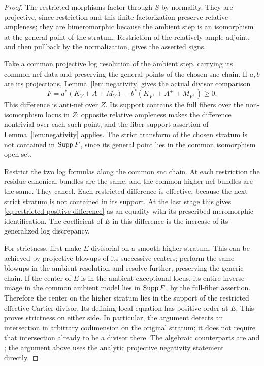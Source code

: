 \begin{proof}
The restricted morphisms factor through $S$ by normality.
They are projective, since restriction and this finite
factorization preserve relative ampleness; they are
bimeromorphic because the ambient step is an isomorphism
at the general point of the stratum.  Restriction of the
relatively ample adjoint, and then pullback by the
normalization, gives the asserted signs.

Take a common projective log resolution of the ambient step,
carrying its common nef data and preserving the general
points of the chosen snc chain.  If $a,b$ are its projections,
Lemma~\ref{lem:negativity} gives the actual divisor comparison
\[
 F=a^*(K_V+A+M_V)-b^*(K_{V^+}+A^++M_{V^+})\geq0.
\]
This difference is anti-nef over $Z$.  Its support contains
the full fibers over the non-isomorphism locus in $Z$:
opposite relative ampleness makes the difference nontrivial
over each such point, and the fiber-support assertion of
Lemma~\ref{lem:negativity} applies.  The strict transform of
the chosen stratum is not contained in $\operatorname{Supp} F$, since its
general point lies in the common isomorphism open set.

Restrict the two log formulas along the common snc chain.
At each restriction the residue canonical bundles are the
same, and the common higher nef bundles are the same.
They cancel.  Each restricted difference is effective,
because the next strict stratum is not contained in its
support.  At the last stage this gives
\eqref{eq:restricted-positive-difference} as an equality
with its prescribed meromorphic identification.  The
coefficient of $E$ in this difference is the increase of its
generalized log discrepancy.

For strictness, first make $E$ divisorial on a smooth higher
stratum.  This can be achieved by projective blowups of its
successive centers; perform the same blowups in the ambient
resolution and resolve further, preserving the generic
chain.  If the center of $E$ is in the ambient exceptional
locus, its entire inverse image in the common ambient model
lies in $\operatorname{Supp} F$, by the full-fiber assertion.  Therefore
the center on the higher stratum lies in the support of the
restricted effective Cartier divisor.  Its defining local
equation has positive order at $E$.  This proves strictness
on either side.  In particular, the argument detects an
intersection in arbitrary codimension on the original
stratum; it does not require that intersection already to
be a divisor there.  The algebraic counterparts are
\cite[Lemma~2.8]{LMT2022} and
\cite[Proposition~3.2]{Moraga2020}; the argument above uses
the analytic projective negativity statement directly.
\end{proof}

